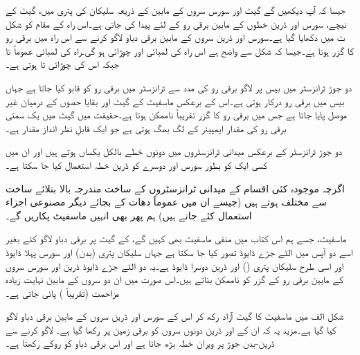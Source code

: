 جیسا کہ آپ دیکھیں گے گیٹ اور سورس سروں کے مابین   کے ذریعہ سلیکان کی پتری میں، گیٹ کے نیچے، سورس اور ڈرین خطوں کے مابین برقی رو کے لئے   پیدا کی جاتی ہے۔اس راہ کے مقام کو شکل  ت میں دکھایا گیا ہے۔سورس اور ڈرین سروں کے مابین برقی دباو لاگو کرنے سے اس راہ میں برقی رو کا گزر ہوتا ہے۔جیسا کہ شکل سے واضح ہے اس راہ کی لمبائی  اور چوڑائی  ہو گی۔راہ کی لمبائی عموماً    تا  جبکہ اس کی چوڑائی  تا  ہوتی ہے۔

دو جوڑ ٹرانزسٹر میں بیس پر لاگو برقی رو کی مدد سے ٹرانزسٹر میں برقی رو  کو قابو کیا جاتا ہے جہاں بیس میں  برقی رو درکار ہوتی ہے۔اس کے برعکس ماسفیٹ کے گیٹ  اور بقایا حصوں کے درمیان غیر موصل  پایا جاتا ہے جس میں برقی رو کا گزر تقریباً ناممکن ہوتا ہے۔حقیقت میں گیٹ میں یک سمتی برقی رو کی مقدار  ایمپیئر کے لگ بھگ  ہوتی ہے جو ایک قابلِ نظر انداز مقدار ہے۔

دو جوڑ ٹرانزسٹر کے برعکس میدانی ٹرانزسٹروں میں دونوں  خطے بالکل یکساں ہوتے ہیں اور ان میں کسی ایک کو بطور سورس اور دوسرے کو ڈرین خطہ استعمال کیا جا سکتا ہے۔ 

اگرچہ موجودہ کئی اقسام کے میدانی ٹرانزسٹروں کے ساخت مندرجہ بالا بتلائے ساخت سے مختلف ہوتے ہیں (جیسے ان میں عموماً دھات کے بجائے دیگر مصنوعی  اجزاء استعمال کئے جاتے ہیں) ہم پھر بھی انہیں ماسفیٹ پکاریں گے۔


 ماسفیٹ، جسے ہم اس کتاب میں منفی ماسفیٹ بھی کہیں گے، کے گیٹ پر برقی دباو لاگو کئے بغیر اسے دو آپس میں الٹے جڑے ڈایوڈ تصور کیا جا سکتا ہے جہاں  سلیکان پتری (بدن) اور   سورس پہلا ڈایوڈ اور اسی طرح   سلیکان پتری () اور   ڈرین دوسرا ڈایوڈ ہے۔یہ دو الٹے جڑے ڈایوڈ ڈرین اور سورس سروں کے مابین برقی رو کے گزر کو ناممکن بناتے ہیں۔اس صورت میں ان دو سروں کے مابین نہایت زیادہ مزاحمت (تقریباً   ) پائی جاتی ہے۔

شکل  الف میں ماسفیٹ کا گیٹ آزاد رکھ کر اس کے سورس اور ڈرین سروں کے مابین برقی دباو  لاگو کیا گیا ہے۔مزید یہ کہ ان کے  اور ڈرین دونوں سروں کو برقی زمین پر رکھا گیا ہے۔   لاگو کرنے سے ڈرین-بدن جوڑ پر ویران خطہ بڑھ جاتا ہے اور اس برقی دباو کو روکے رکھتا ہے۔

